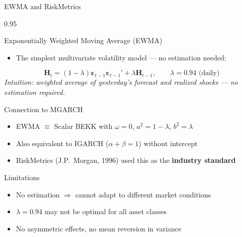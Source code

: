 \documentclass[9pt, aspectratio=169, t]{beamer}
\begin{document}
\begin{frame}{EWMA and RiskMetrics}
    \begin{cminipage}{0.95\textwidth}
    {\footnotesize
    \begin{block}{Exponentially Weighted Moving Average (EWMA)}
        \begin{itemize}\setlength{\itemsep}{0pt}
            \item The simplest multivariate volatility model --- no estimation needed:
        \end{itemize}
        \vspace{-2mm}
        \[
            \mathbf{H}_t = (1-\lambda)\boldsymbol{\varepsilon}_{t-1}\boldsymbol{\varepsilon}_{t-1}' + \lambda\mathbf{H}_{t-1}, \qquad \lambda = 0.94 \text{ (daily)}
        \]
        \vspace{-2mm}
        \textit{Intuition: weighted average of yesterday's forecast and realized shocks --- no estimation required.}
    \end{block}
    \begin{block}{Connection to MGARCH}
        \begin{itemize}\setlength{\itemsep}{0pt}
            \item EWMA $\equiv$ Scalar BEKK with $\omega = 0$, $a^2 = 1-\lambda$, $b^2 = \lambda$
            \item Also equivalent to IGARCH ($\alpha + \beta = 1$) without intercept
            \item RiskMetrics (J.P.\ Morgan, 1996) used this as the \textbf{industry standard}
        \end{itemize}
    \end{block}
    \vspace{0.1cm}
    \begin{alertblock}{Limitations}
        \begin{itemize}\setlength{\itemsep}{0pt}
            \item No estimation $\Rightarrow$ cannot adapt to different market conditions
            \item $\lambda = 0.94$ may not be optimal for all asset classes
            \item No asymmetric effects, no mean reversion in variance
        \end{itemize}
    \end{alertblock}
    }
    \end{cminipage}
\end{frame}
\end{document}
